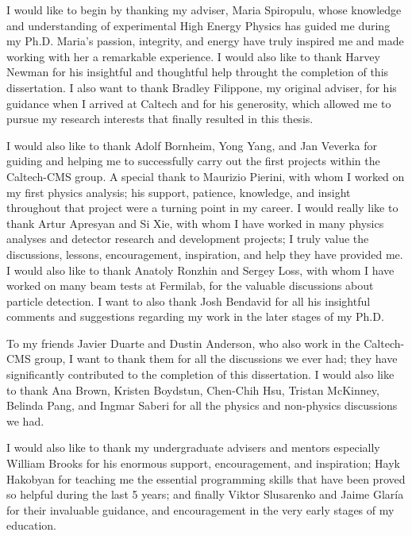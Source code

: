 \documentclass[14pt]{caltech_thesis}
\begin{document}
\par\vspace*{.2\textheight}{\centering To my parents, brother, wife, and son\par}
\clearpage
\begin{acknowledgements} 	 
  I would like to begin by thanking my adviser, Maria Spiropulu, whose
  knowledge and understanding of experimental High Energy Physics has
  guided me during my Ph.D. Maria's passion, integrity, and energy have
  truly inspired me and made working with her a remarkable
  experience. I would also like to thank Harvey Newman for his
  insightful and thoughtful help throught the completion of this
  dissertation. I also want to thank Bradley Filippone, my original
  adviser, for his guidance when I arrived at Caltech and for his
  generosity, which allowed me to pursue my research interests that finally resulted in
  this thesis. 

I would also like to thank Adolf Bornheim, Yong Yang, and Jan Veverka
for guiding and helping me to successfully carry out the first projects within the
Caltech-CMS group. A special thank to Maurizio Pierini, with whom I
worked on my first physics analysis; his support, patience, knowledge,
and insight 
throughout that project were a turning point in my career. I would really
like to thank Artur Apresyan and Si Xie, with whom I have worked in
many physics analyses and detector research and development projects; I
truly value the discussions, lessons, encouragement, inspiration, and help they have
provided me. I would also like to thank Anatoly Ronzhin and Sergey
Loss, with whom I have worked on many beam tests at Fermilab, for the
valuable discussions about particle detection. I want to also thank  Josh Bendavid for all 
his insightful comments and suggestions regarding my work in the later stages of my Ph.D.

To my friends Javier Duarte and Dustin Anderson, who also work in the
Caltech-CMS group, I want to thank them for all the discussions we ever
had; they have significantly contributed to the completion of this
dissertation. I would also like to thank Ana Brown, Kristen Boydstun,
Chen-Chih Hsu,
Tristan McKinney, Belinda Pang, and Ingmar Saberi for all the physics
and non-physics discussions we had.

I would also like to thank my undergraduate advisers and mentors especially  William Brooks
for his enormous support, encouragement, and inspiration; Hayk Hakobyan
for teaching me the essential programming skills that have been
proved so helpful during the last 5 years; and finally Viktor Slusarenko and
Jaime Glar\'ia for their invaluable guidance, and encouragement in the very early stages of my
education.



\end{acknowledgements}
\end{document}
